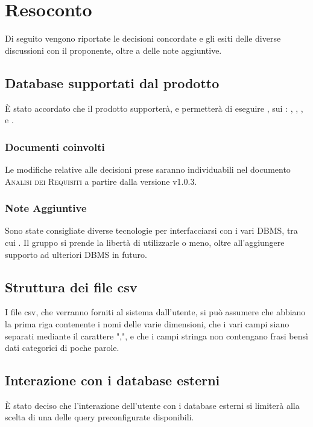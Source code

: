 \documentclass{article}
\begin{document}
\newpage

\section{Resoconto}
\label{sec:resoconto}

Di seguito vengono riportate le decisioni concordate e gli esiti delle diverse discussioni con il proponente, oltre a 
delle note aggiuntive.

\subsection{Database supportati dal prodotto}
\label{itm:1}

\`{E} stato accordato che il prodotto supporter\`{a}, e permetter\`{a} di eseguire , sui : 
, ,  ,  e .

\subsubsection*{Documenti coinvolti}
Le modifiche relative alle decisioni prese saranno individuabili nel documento \textsc{Analisi dei Requisiti} a partire 
dalla versione v1.0.3.

\subsubsection*{Note Aggiuntive}
Sono state consigliate diverse tecnologie per interfacciarsi con i vari DBMS, tra cui . Il gruppo
si prende la libert\`{a} di utilizzarle o meno, oltre all'aggiungere supporto ad ulteriori DBMS in futuro.

\subsection{Struttura dei file csv}
\label{itm:2}

I file csv, che verranno forniti al sistema dall'utente, si pu\`{o} assumere che abbiano la prima riga contenente i nomi 
delle varie dimensioni, che i vari campi siano separati mediante il carattere ",", e che i campi stringa non contengano 
frasi bens\`{i} dati categorici di poche parole.

\subsection{Interazione con i database esterni}
\label{itm:3}
\`{E} stato deciso che l'interazione dell'utente con i database esterni si limiter\`{a} alla scelta di una delle query 
preconfigurate disponibili.
\end{document}
